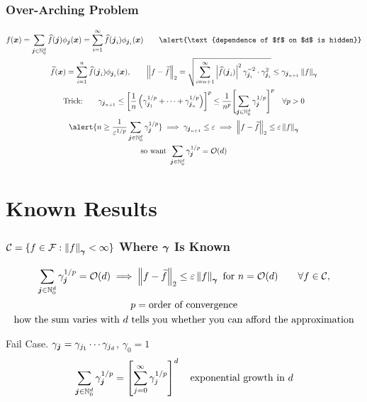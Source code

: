 \documentclass[11pt,compress,xcolor={usenames,dvipsnames},aspectratio=169]{beamer}
\begin{document}
\begin{frame}
\frametitle{Over-Arching Problem}
\vspace{-6ex}
\begin{gather*}
f(\vx) = \sum_{\vj \in \natzero^d} \hf(\vj) \phi_{\vj}(\vx) =  \sum_{i =1}^{\infty} \hf(\vj_i) \phi_{\vj_i}(\vx) \qquad \alert{\text{dependence of $f$ on $d$ is hidden}}  
\\
\tf(\vx) = \sum_{i=1}^{n} \hf(\vj_i) \phi_{\vj_i}(\vx), \qquad \norm[2]{f - \tf} = 
\sqrt{\sum_{i = n+1}^{\infty} \abs{\hf(\vj_i)}^2 \gamma_{\vj_{i}}^{-2}  \cdot \gamma_{\vj_{i}}^2} \le \gamma_{\vj_{n+1}} \norm[\vgamma]{f} \\
	\text{Trick:}  \qquad \gamma_{\vj_{n+1}} \le \left[\frac1n \left(\gamma_{\vj_1}^{1/p} + \cdots +  \gamma_{\vj_n}^{1/p}  \right) \right]^p \le \frac {1}{n^p} \Biggl[ \sum_{\vj \in \natzero^d} \gamma_{\vj}^{1/p}  \Biggr]^p \quad \forall p > 0 \\
	\alert{n \ge \frac 1 {\varepsilon^{1/p}} \sum_{\vj \in \natzero^d} \gamma_{\vj}^{1/p}} \implies   \gamma_{\vj_{n+1}} \le \varepsilon \implies \norm[2]{f - \tf}  \le \varepsilon \norm[\vgamma]{f} \\ \text{so want } \sum_{\vj \in \natzero^d} \gamma_{\vj}^{1/p} = \Order(d)
	\end{gather*}

\end{frame}


\section{Known Results}
\begin{frame}
\frametitle{$\cc = \{f \in \cf : \norm[\vgamma]{f} < \infty \}$ Where $\vgamma$ Is Known}
\vspace{-8ex}
\begin{gather*}
 \sum_{\vj \in \natzero^d} \gamma_{\vj}^{1/p} = \Order(d) \implies \norm[2]{f - \tf}  \le \varepsilon \norm[\vgamma]{f} \text{ for } n = \Order(d) \qquad \forall f \in \cc, \\
 p = \text{order of convergence} \\
 \text{how the sum varies with $d$ tells you whether you can afford the approximation}
\end{gather*}

\vspace{-1ex}

\alert{Fail} Case.  $\gamma_{\vj} = \gamma_{j_1} \cdots \gamma_{j_d}$, $\gamma_0 = 1$
\[
\sum_{\vj \in \natzero^d} \gamma_{\vj}^{1/p} 
= \left[\sum_{j = 0}^{\infty} \gamma_{j}^{1/p}\right]^d \quad \text{exponential growth in } d
\]

\end{frame}
\end{document}
